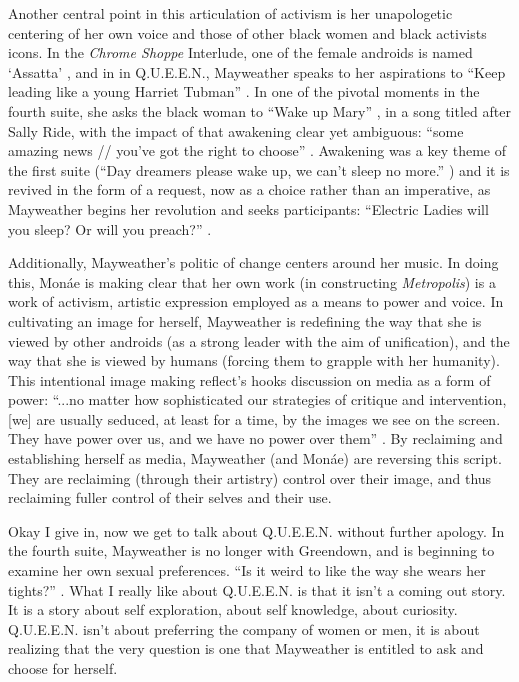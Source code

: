 \documentclass[a4paper, 11pt]{article} %
\begin{document}
Another central point in this articulation of activism is her unapologetic centering of her own voice and those of other black women and black activists icons.
In the \emph{Chrome Shoppe} Interlude, one of the female androids is named `Assatta' \cite{chromeshoppe}, and in in Q.U.E.E.N., Mayweather speaks to her aspirations to ``Keep leading like a young Harriet Tubman'' \cite{queen}.
In one of the pivotal moments in the fourth suite, she asks the black woman to ``Wake up Mary'' \cite{sallyride}, in a song titled after Sally Ride, with the impact of that awakening clear yet ambiguous: ``some amazing news // you've got the right to choose'' \cite{sallyride}. 
Awakening was a key theme of the first suite (``Day dreamers please wake up, we can't sleep no more.'' \cite{sincerelyjane}) and it is revived in the form of a request, now as a choice rather than an imperative, as Mayweather begins her revolution and seeks participants: ``Electric Ladies will you sleep? Or will you preach?'' \cite{queen}.

Additionally, Mayweather's politic of change centers around her music.
In doing this, Mon\'ae is making clear that her own work (in constructing \emph{Metropolis}) is a work of activism, artistic expression employed as a means to power and voice.
In cultivating an image for herself, Mayweather is redefining the way that she is viewed by other androids (as a strong leader with the aim of unification), and the way that she is viewed by humans (forcing them to grapple with her humanity).
This intentional image making reflect's hooks discussion on media as a form of power: ``...no matter how sophisticated our strategies of critique and intervention, [we] are usually seduced, at least for a time, by the images we see on the screen. They have power over us, and we have no power over them'' \cite{hooksreeltoreal}.
By reclaiming and establishing herself as media, Mayweather (and Mon\'ae) are reversing this script.
They are reclaiming (through their artistry) control over their image, and thus reclaiming fuller control of their selves and their use.

Okay I give in, now we get to talk about Q.U.E.E.N. without further apology.
In the fourth suite, Mayweather is no longer with Greendown, and is beginning to examine her own sexual preferences.
``Is it weird to like the way she wears her tights?'' \cite{queen}.
What I really like about Q.U.E.E.N. is that it isn't a coming out story.
It is a story about self exploration, about self knowledge, about curiosity. 
Q.U.E.E.N. isn't about preferring the company of women or men, it is about realizing that the very question is one that Mayweather is entitled to ask and choose for herself.
\end{document}
